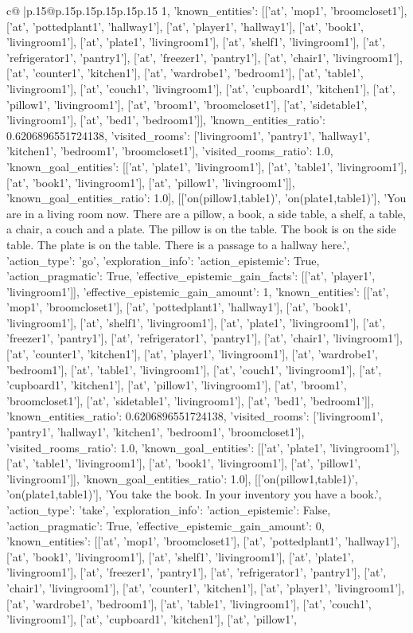 \documentclass{article}
\begin{document}
{\begin{supertabular}{c@{$\;$}|p{.15\linewidth}@{}p{.15\linewidth}p{.15\linewidth}p{.15\linewidth}p{.15\linewidth}p{.15\linewidth}}
{{{1, 'known_entities': [['at', 'mop1', 'broomcloset1'], ['at', 'pottedplant1', 'hallway1'], ['at', 'player1', 'hallway1'], ['at', 'book1', 'livingroom1'], ['at', 'plate1', 'livingroom1'], ['at', 'shelf1', 'livingroom1'], ['at', 'refrigerator1', 'pantry1'], ['at', 'freezer1', 'pantry1'], ['at', 'chair1', 'livingroom1'], ['at', 'counter1', 'kitchen1'], ['at', 'wardrobe1', 'bedroom1'], ['at', 'table1', 'livingroom1'], ['at', 'couch1', 'livingroom1'], ['at', 'cupboard1', 'kitchen1'], ['at', 'pillow1', 'livingroom1'], ['at', 'broom1', 'broomcloset1'], ['at', 'sidetable1', 'livingroom1'], ['at', 'bed1', 'bedroom1']], 'known_entities_ratio': 0.6206896551724138, 'visited_rooms': ['livingroom1', 'pantry1', 'hallway1', 'kitchen1', 'bedroom1', 'broomcloset1'], 'visited_rooms_ratio': 1.0, 'known_goal_entities': [['at', 'plate1', 'livingroom1'], ['at', 'table1', 'livingroom1'], ['at', 'book1', 'livingroom1'], ['at', 'pillow1', 'livingroom1']], 'known_goal_entities_ratio': 1.0}}], [['on(pillow1,table1)', 'on(plate1,table1)'], 'You are in a living room now. There are a pillow, a book, a side table, a shelf, a table, a chair, a couch and a plate. The pillow is on the table. The book is on the side table. The plate is on the table. There is a passage to a hallway here.', {'action_type': 'go', 'exploration_info': {'action_epistemic': True, 'action_pragmatic': True, 'effective_epistemic_gain_facts': [['at', 'player1', 'livingroom1']], 'effective_epistemic_gain_amount': 1, 'known_entities': [['at', 'mop1', 'broomcloset1'], ['at', 'pottedplant1', 'hallway1'], ['at', 'book1', 'livingroom1'], ['at', 'shelf1', 'livingroom1'], ['at', 'plate1', 'livingroom1'], ['at', 'freezer1', 'pantry1'], ['at', 'refrigerator1', 'pantry1'], ['at', 'chair1', 'livingroom1'], ['at', 'counter1', 'kitchen1'], ['at', 'player1', 'livingroom1'], ['at', 'wardrobe1', 'bedroom1'], ['at', 'table1', 'livingroom1'], ['at', 'couch1', 'livingroom1'], ['at', 'cupboard1', 'kitchen1'], ['at', 'pillow1', 'livingroom1'], ['at', 'broom1', 'broomcloset1'], ['at', 'sidetable1', 'livingroom1'], ['at', 'bed1', 'bedroom1']], 'known_entities_ratio': 0.6206896551724138, 'visited_rooms': ['livingroom1', 'pantry1', 'hallway1', 'kitchen1', 'bedroom1', 'broomcloset1'], 'visited_rooms_ratio': 1.0, 'known_goal_entities': [['at', 'plate1', 'livingroom1'], ['at', 'table1', 'livingroom1'], ['at', 'book1', 'livingroom1'], ['at', 'pillow1', 'livingroom1']], 'known_goal_entities_ratio': 1.0}}], [['on(pillow1,table1)', 'on(plate1,table1)'], 'You take the book. In your inventory you have a book.', {'action_type': 'take', 'exploration_info': {'action_epistemic': False, 'action_pragmatic': True, 'effective_epistemic_gain_amount': 0, 'known_entities': [['at', 'mop1', 'broomcloset1'], ['at', 'pottedplant1', 'hallway1'], ['at', 'book1', 'livingroom1'], ['at', 'shelf1', 'livingroom1'], ['at', 'plate1', 'livingroom1'], ['at', 'freezer1', 'pantry1'], ['at', 'refrigerator1', 'pantry1'], ['at', 'chair1', 'livingroom1'], ['at', 'counter1', 'kitchen1'], ['at', 'player1', 'livingroom1'], ['at', 'wardrobe1', 'bedroom1'], ['at', 'table1', 'livingroom1'], ['at', 'couch1', 'livingroom1'], ['at', 'cupboard1', 'kitchen1'], ['at', 'pillow1', }}}
\end{supertabular}}
\end{document}
